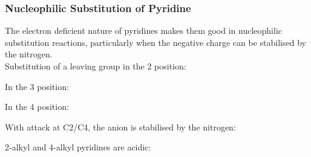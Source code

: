 
\subsubsection{Nucleophilic Substitution of Pyridine}

The electron deficient nature of pyridines makes them good in nucleophilic substitution reactions, particularly when the negative charge can be stabilised by the nitrogen.\\

Substitution of a leaving group in the 2 position:


In the 3 position:


In the 4 position:


With attack at C2/C4, the anion is stabilised by the nitrogen:


2-alkyl and 4-alkyl pyridines are acidic:

